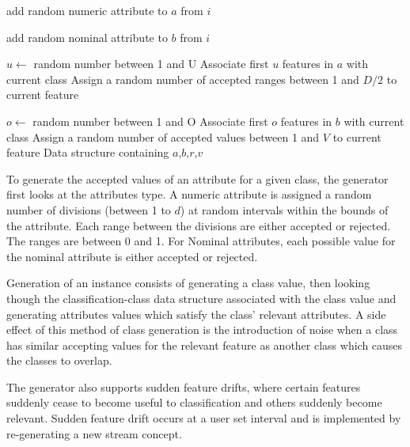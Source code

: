 \begin{algorithm}[h]
\begin{algorithmic}[1]
            \State add random numeric attribute to $a$ from $i$
            \EndFor
            
            \State add random nominal attribute to $b$ from $i$
            \EndFor
            
            	\State $u \gets$ random number between 1 and U
            	\State Associate first $u$ features in $a$ with current class
                	\State Assign a random number of accepted ranges between 1 and $D/2$ to current feature
                \EndFor
                
            	\State $o \gets$ random number between 1 and O
            	\State Associate first $o$ features in $b$ with current class
                	\State Assign a random number of accepted values between 1 and $V$ to current feature
                \EndFor
            \EndFor
            \State \Return Data structure containing $a$,$b$,$r$,$v$
        \EndProcedure
    \end{algorithmic}
\end{algorithm}

To generate the accepted values of an attribute for a given class, the generator first looks at the attributes type. A numeric attribute is assigned a random number of divisions (between 1 to $d$) at random intervals within the bounds of the attribute. Each range between the divisions are either accepted or rejected. The ranges are between 0 and 1. For Nominal attributes, each possible value for the nominal attribute is either accepted or rejected.\bigskip

Generation of an instance consists of generating a class value, then looking though the classification-class data structure associated with the class value and generating attributes values which satisfy the class' relevant attributes. A side effect of this method of class generation is the introduction of noise when a class has similar accepting values for the relevant feature as another class which causes the classes to overlap.

The generator also supports sudden feature drifts, where certain features suddenly cease to become useful to classification and others suddenly become relevant. Sudden feature drift occurs at a user set interval and is implemented by re-generating a new stream concept.\bigskip


